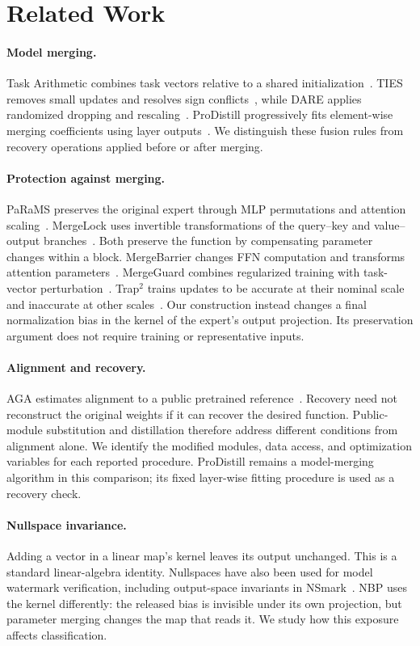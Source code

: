 \section{Related Work}
\paragraph{Model merging.}
Task Arithmetic combines task vectors relative to a shared initialization~\cite{ilharco2023task}. TIES removes small updates and resolves sign conflicts~\cite{yadav2023ties}, while DARE applies randomized dropping and rescaling~\cite{yu2024dare}. ProDistill progressively fits element-wise merging coefficients using layer outputs~\cite{xu2025prodistill}. We distinguish these fusion rules from recovery operations applied before or after merging.

\paragraph{Protection against merging.}
PaRaMS preserves the original expert through MLP permutations and attention scaling~\cite{wei2025params}. MergeLock uses invertible transformations of the query--key and value--output branches~\cite{wang2025mergelock}. Both preserve the function by compensating parameter changes within a block. MergeBarrier changes FFN computation and transforms attention parameters~\cite{li2025mergebarrier}. MergeGuard combines regularized training with task-vector perturbation~\cite{chen2026mergeguard}. Trap$^2$ trains updates to be accurate at their nominal scale and inaccurate at other scales~\cite{jang2026trap2}. Our construction instead changes a final normalization bias in the kernel of the expert's output projection. Its preservation argument does not require training or representative inputs.

\paragraph{Alignment and recovery.}
AGA estimates alignment to a public pretrained reference~\cite{guo2026aga}. Recovery need not reconstruct the original weights if it can recover the desired function. Public-module substitution and distillation therefore address different conditions from alignment alone. We identify the modified modules, data access, and optimization variables for each reported procedure. ProDistill remains a model-merging algorithm in this comparison; its fixed layer-wise fitting procedure is used as a recovery check.

\paragraph{Nullspace invariance.}
Adding a vector in a linear map's kernel leaves its output unchanged. This is a standard linear-algebra identity. Nullspaces have also been used for model watermark verification, including output-space invariants in NSmark~\cite{zhao2024nsmark}. NBP uses the kernel differently: the released bias is invisible under its own projection, but parameter merging changes the map that reads it. We study how this exposure affects classification.
